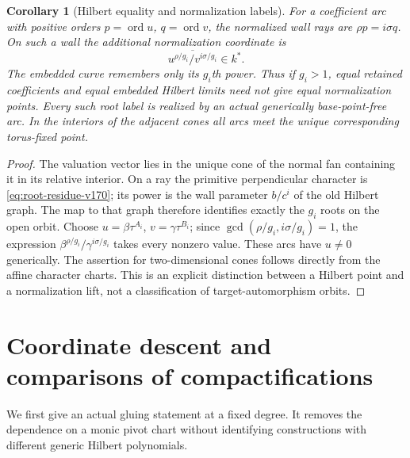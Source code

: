 \documentclass[11pt,reqno]{amsart}
\numberwithin{equation}{section}
\newtheorem{corollary}[theorem]{Corollary}
\theoremstyle{definition}\newtheorem{definition}[theorem]{Definition}
\theoremstyle{remark}\newtheorem{remark}[theorem]{Remark}
\begin{document}
\begin{corollary}[Hilbert equality and normalization labels]
\label{cor:hilbert-lifts-v170}
For a coefficient arc with positive orders $p=\operatorname{ord}u$,
$q=\operatorname{ord}v$, the normalized wall rays are
$\rho p=i\sigma q$. On such a wall the additional normalization
coordinate is
\[
 \overline{u^{\rho/g_i}/v^{i\sigma/g_i}}\in k^*.
\]
The embedded curve remembers only its $g_i$th power. Thus if
$g_i>1$, equal retained coefficients and equal embedded Hilbert
limits need not give equal normalization points. Every such root
label is realized by an actual generically base-point-free arc.
In the interiors of the adjacent cones all arcs meet the unique
corresponding torus-fixed point.
\end{corollary}
\begin{proof}
The valuation vector lies in the unique cone of the normal fan
containing it in its relative interior. On a ray the primitive
perpendicular character is \eqref{eq:root-residue-v170}; its power
is the wall parameter $b/c^i$ of the old Hilbert graph. The map to
that graph therefore identifies exactly the $g_i$ roots on the
open orbit. Choose $u=\beta\tau^{A_i}$,
$v=\gamma\tau^{B_i}$; since
$\gcd(\rho/g_i,i\sigma/g_i)=1$, the expression
$\beta^{\rho/g_i}/\gamma^{i\sigma/g_i}$ takes every nonzero value.
These arcs have $u\ne0$ generically. The assertion for two-dimensional
cones follows directly from the affine character charts. This is an
explicit distinction between a Hilbert point and a normalization
lift, not a classification of target-automorphism orbits.
\end{proof}

\section{Coordinate descent and comparisons of compactifications}
\label{sec:equivariant-v169}
We first give an actual gluing statement at a fixed degree. It removes
the dependence on a monic pivot chart without identifying constructions
with different generic Hilbert polynomials.
\end{document}
